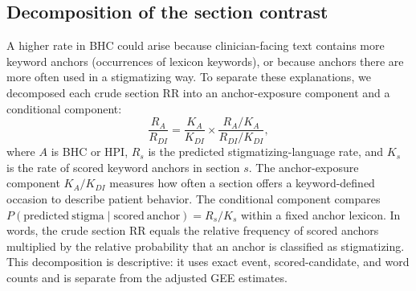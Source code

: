 \documentclass[unnumsec,webpdf,contemporary,large]{oup-authoring-template}
\begin{document}
\begin{table}[H]
\caption{Layer 3 disease modification estimates in unverified ICD-coded cohorts}
\label{tab:s_layer3}
\end{table}

\subsection{Decomposition of the section contrast}

A higher rate in BHC could arise because clinician-facing text contains more keyword anchors (occurrences of lexicon keywords), or because anchors there are more often used in a stigmatizing way. To separate these explanations, we decomposed each crude section RR into an anchor-exposure component and a conditional component:
\[
\frac{R_A}{R_{DI}} =
\frac{K_A}{K_{DI}}
\times
\frac{R_A/K_A}{R_{DI}/K_{DI}},
\]
where $A$ is BHC or HPI, $R_s$ is the predicted stigmatizing-language rate, and $K_s$ is the rate of scored keyword anchors in section $s$. The anchor-exposure component $K_A/K_{DI}$ measures how often a section offers a keyword-defined occasion to describe patient behavior. The conditional component compares $P(\mathrm{predicted\ stigma}\mid\mathrm{scored\ anchor})=R_s/K_s$ within a fixed anchor lexicon. In words, the crude section RR equals the relative frequency of scored anchors multiplied by the relative probability that an anchor is classified as stigmatizing. This decomposition is descriptive: it uses exact event, scored-candidate, and word counts and is separate from the adjusted GEE estimates.
\end{document}
